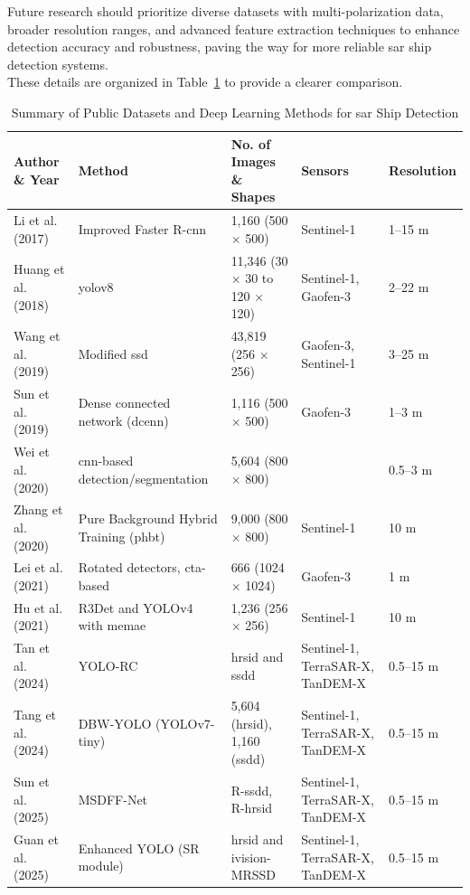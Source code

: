 \documentclass{article}
\begin{document}
Future research should prioritize diverse datasets with multi-polarization data, broader resolution ranges, and advanced feature extraction techniques to enhance detection accuracy and robustness, paving the way for more reliable \acrshort{sar} ship detection systems.\\


These details are organized in Table~\ref{tab:sar_ship_detection} to provide a clearer comparison. \begin{table}%
\centering
\footnotesize
\begin{tabularx}{\textwidth}{@{}lXlXl@{}}
\toprule
\textbf{Author \& Year} & \textbf{Method} & \textbf{No. of Images \& Shapes} & \textbf{Sensors} & \textbf{Resolution} \\
\midrule
Li et al. (2017) \cite{8124934} & Improved Faster R-\acrshort{cnn} & 1,160 (500 × 500) & Sentinel-1 & 1–15 m \\
Huang et al. (2018) \cite{8124929} & \acrshort{yolov8} & 11,346 (30 × 30 to 120 × 120) & Sentinel-1, Gaofen-3 & 2–22 m \\
Wang et al. (2019) \cite{rs11070765} & Modified \acrshort{ssd} & 43,819 (256 × 256) & Gaofen-3, Sentinel-1 & 3–25 m \\
Sun et al. (2019) \cite{R19097} & Dense connected network (\acrshort{dcenn}) & 1,116 (500 × 500) & Gaofen-3 & 1–3 m \\
Wei et al. (2020) \cite{9127939} & \acrshort{cnn}-based detection/segmentation & 5,604 (800 × 800) &   & 0.5–3 m \\
Zhang et al. (2020) \cite{rs12182997} & Pure Background Hybrid Training (\acrshort{phbt}) & 9,000 (800 × 800) & Sentinel-1 & 10 m \\
Lei et al. (2021) \cite{rs13245104} & Rotated detectors, \acrshort{cta}-based & 666 (1024 × 1024) & Gaofen-3 & 1 m \\
Hu et al. (2021)  \cite{s21248478} & R3Det and YOLOv4 with \acrshort{memae} & 1,236 (256 × 256) & Sentinel-1 & 10 m \\
Tan et al. (2024) \cite{tan2024yolo} & YOLO-RC & \acrshort{hrsid} and \acrshort{ssdd} & Sentinel-1, TerraSAR-X, TanDEM-X & 0.5–15 m \\
Tang et al. (2024) \cite{tang2024dbw} & DBW-YOLO (YOLOv7-tiny) & 5,604 (\acrshort{hrsid}), 1,160 (\acrshort{ssdd}) & Sentinel-1, TerraSAR-X, TanDEM-X & 0.5–15 m \\
Sun et al. (2025) \cite{sun2025arbitrary} & MSDFF-Net & R-\acrshort{ssdd}, R-\acrshort{hrsid} & Sentinel-1, TerraSAR-X, TanDEM-X & 0.5–15 m \\
Guan et al. (2025) \cite{guan2025sar} & Enhanced YOLO (SR module) & \acrshort{hrsid} and \acrshort{ivision}-MRSSD & Sentinel-1, TerraSAR-X, TanDEM-X & 0.5–15 m \\
\bottomrule
\end{tabularx}
\caption{Summary of Public Datasets and Deep Learning Methods for \acrshort{sar} Ship Detection}
\label{tab:sar_ship_detection}
\end{table}
\end{document}
